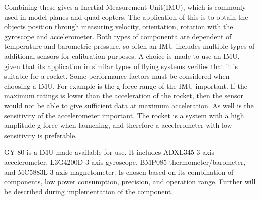 Combining these gives a Inertial Measurement Unit(IMU), which is commonly used in model planes and quad-copters. The application of this is to obtain the objects position through measuring velocity, orientation, rotation with the gyroscope and accelerometer. Both types of componenta are dependent of temperature and barometric pressure, so often an IMU includes multiple types of additional sensors for calibration purposes. A choice is made to use an IMU, given that its application in similar types of flying systems verifies that it is suitable for a rocket.    	  
Some performance factors must be considered when choosing a IMU. For example is the g-force range of the IMU important. If the maximum ratings is lower than the acceleration of the rocket, then the sensor would not be able to give sufficient data at maximum acceleration. As well is the sensitivity of the accelerometer important. The rocket is a system with a high amplitude g-force when launching, and therefore a accelerometer with low sensitivity is preferable.

GY-80 is a IMU made available for use. It includes ADXL345 3-axis accelerometer, L3G4200D 3-axis gyroscope, BMP085 thermometer/barometer, and MC5883L 3-axis magnetometer. Is chosen based on its combination of components, low power consumption, precision, and operation range. Further will be described during implementation of the component.

